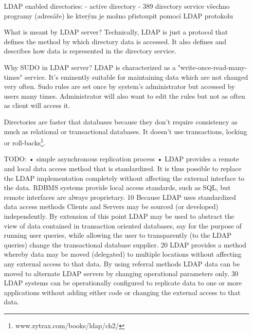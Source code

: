 \documentclass[10pt,a4paper,notitlepage]{article}
\begin{document}
LDAP enabled directories:
- active directory
- 389 directory service
 všechno programy (adresáře) ke kterým je možno přistoupit pomocí LDAP protokolu

What is meant by LDAP server?
Technically, LDAP is just a protocol that defines the method by which directory data is accessed. It also defines and describes how data is represented in the directory service.

Why SUDO in LDAP server?
LDAP is characterized as a "write-once-read-many-times" service. It's eminently suitable for maintaining data which are not changed very often. Sudo rules are set once by system's administrator but accessed by users many times. Administrator will also want to edit the rules but not as often as client will access it.

Directories are faster that databases because they don't require consistency as much as relational or transactional databases. It doesn't use transactions, locking or roll-backs\footnote{www.zytrax.com/books/ldap/ch2/}.

TODO:
•	simple asynchronous replication process
•	LDAP provides a remote and local data access method that is standardized. It is thus possible to replace the LDAP implementation completely without affecting the external interface to the data. RDBMS systems provide local access standards, such as SQL, but remote interfaces are always proprietary.
10	Because LDAP uses standardized data access methods Clients and Servers may be sourced (or developed) independently. By extension of this point LDAP may be used to abstract the view of data contained in transaction oriented databases, say for the purpose of running user queries, while allowing the user to transparently (to the LDAP queries) change the transactional database supplier.
20	LDAP provides a method whereby data may be moved (delegated) to multiple locations without affecting any external access to that data. By using referral methods LDAP data can be moved to alternate LDAP servers by changing operational parameters only.
30	LDAP systems can be operationally configured to replicate data to one or more applications without adding either code or changing the external access to that data.




	
\end{document}
